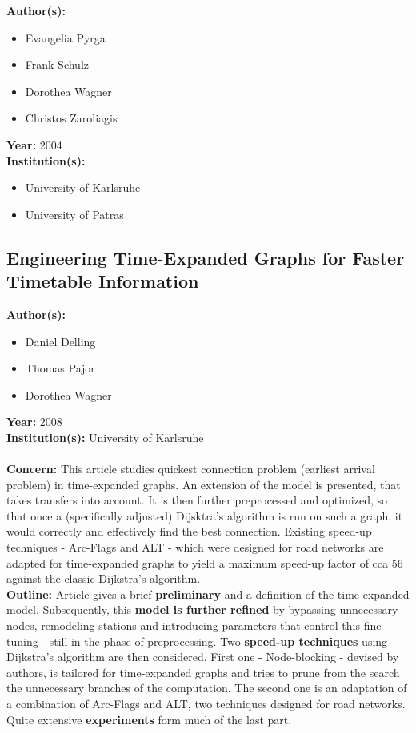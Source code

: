 \documentclass[a4paper]{article}
\newenvironment{itemizesp}
{
    \begin{itemize}
}
{
    \end{itemize}
}
\newcommand{\textbff}[1]{{\large \textbf{#1}}}
\begin{document}
        \textbff{Author(s): }
        \begin{itemizesp}
            \item Evangelia Pyrga
            \item Frank Schulz
            \item Dorothea Wagner
            \item Christos Zaroliagis
        \end{itemizesp}
        \textbff{Year: }2004 \\
        \textbff{Institution(s): }
        \begin{itemizesp}
            \item University of Karlsruhe
            \item University of Patras
        \end{itemizesp}

        \subsection{Engineering Time-Expanded Graphs for Faster Timetable Information}
        \label{subsec:engtimeexp}

        \textbff{Author(s): }
        \begin{itemizesp}
            \item Daniel Delling
            \item Thomas Pajor
            \item Dorothea Wagner
        \end{itemizesp}
        \textbff{Year: }2008 \\
        \textbff{Institution(s): } University of Karlsruhe \\
         {\hfill}\\
        \textbff{Concern:} This article studies quickest connection problem (earliest arrival problem) in time-expanded graphs. An extension of the model is presented, that takes transfers into account. It is then further preprocessed and optimized, so that once a (specifically adjusted) Dijsktra's algorithm is run on such a graph, it would correctly and effectively find the best connection. Existing speed-up techniques - Arc-Flags and ALT - which were designed for road networks are adapted for time-expanded graphs to yield a maximum speed-up factor of cca 56 against the classic Dijkstra's algorithm. \\

        \textbff{Outline:} Article gives a brief \textbf{preliminary} and a definition of the time-expanded model. Subsequently, this \textbf{model is further refined} by bypassing unnecessary nodes, remodeling stations and introducing parameters that control this fine-tuning - still in the phase of preprocessing. Two \textbf{speed-up techniques} using Dijkstra's algorithm are then considered. First one - Node-blocking - devised by authors, is tailored for time-expanded graphs and tries to prune from the search the unnecessary branches of the computation. The second one is an adaptation of a combination of Arc-Flags and ALT, two techniques designed for road networks. Quite extensive \textbf{experiments} form much of the last part. \\
\end{document}
